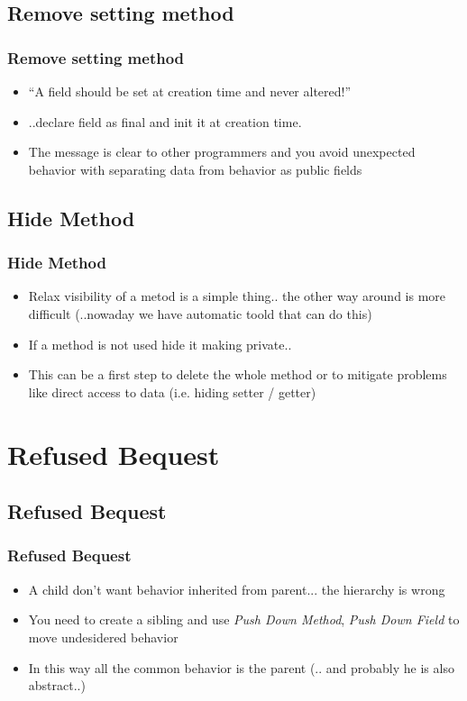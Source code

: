 \documentclass{beamer}
\begin{document}
\subsection{Remove setting method}
\begin{frame}
  \frametitle{Remove setting method}
  \begin{itemize}
	\item<+-> ``A field should be set at creation time and never altered!''
	\item<+-> ..declare field as final and init it at creation time.
	\item<+-> The message is clear to other programmers and you avoid unexpected behavior with separating data from behavior as public fields
   \end{itemize}
\end{frame}

\subsection{Hide Method}
\begin{frame}
  \frametitle{Hide Method}
  \begin{itemize}
	\item<+-> Relax visibility of a metod is a simple thing.. the other way around is more difficult (..nowaday we have automatic toold that can do this)
	\item<+-> If a method is not used hide it making private.. 
	\item<+-> This can be a first step to delete the whole method or to mitigate problems like direct access to data (i.e. hiding setter / getter)
   \end{itemize}
\end{frame}

\section{Refused Bequest}
\subsection{Refused Bequest}
\begin{frame}
  \frametitle{Refused Bequest}
  \begin{itemize}
	\item<+-> A child don't want behavior inherited from parent... the hierarchy is wrong
	\item<+-> You need to create a sibling and use \textit{Push Down Method}, \textit{Push Down Field} to move undesidered behavior
	\item<+-> In this way all the common behavior is the parent (.. and probably he is also abstract..)
   \end{itemize}
\end{frame}
\end{document}

